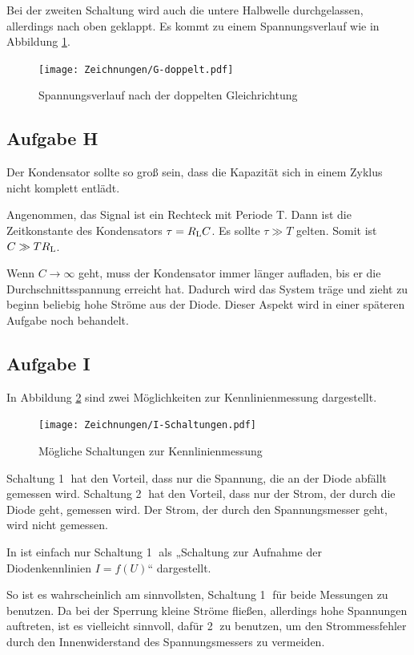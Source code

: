 Bei der zweiten Schaltung wird auch die untere Halbwelle durchgelassen,
allerdings nach oben geklappt. Es kommt zu einem Spannungsverlauf wie in
Abbildung \ref{fig:G-doppelt}.

\begin{figure}[h]
	\centering
	\caption{%
		Spannungsverlauf nach der doppelten Gleichrichtung
	}
	\label{fig:G-doppelt}
	\texttt{[image: Zeichnungen/G-doppelt.pdf]}
\end{figure}

\subsection{Aufgabe H}

Der Kondensator sollte so groß sein, dass die Kapazität sich in einem Zyklus
nicht komplett entlädt.

Angenommen, das Signal ist ein Rechteck mit Periode T. Dann ist die
Zeitkonstante des Kondensators $\tau = R_\text L C$. Es sollte $\tau \gg T$
gelten. Somit ist $C \gg T R_\text L$.

Wenn $C \to \infty$ geht, muss der Kondensator immer länger aufladen, bis er
die Durchschnittsspannung erreicht hat. Dadurch wird das System träge und zieht
zu beginn beliebig hohe Ströme aus der Diode. Dieser Aspekt wird in einer
späteren Aufgabe noch behandelt.

\subsection{Aufgabe I}

In Abbildung \ref{fig:I-Schaltungen} sind zwei Möglichkeiten zur
Kennlinienmessung dargestellt.

\begin{figure}[h]
	\centering
	\caption{%
		Mögliche Schaltungen zur Kennlinienmessung
	}
	\label{fig:I-Schaltungen}
	\texttt{[image: Zeichnungen/I-Schaltungen.pdf]}
\end{figure}

Schaltung \textcircled 1 hat den Vorteil, dass nur die Spannung, die an der
Diode abfällt gemessen wird. Schaltung \textcircled 2 hat den Vorteil, dass nur
der Strom, der durch die Diode geht, gemessen wird. Der Strom, der durch den
Spannungsmesser geht, wird nicht gemessen.

In \cite[Bild 14.2]{beuth/elementare_elektronik} ist einfach nur Schaltung
\textcircled 1 als „Schaltung zur Aufnahme der Diodenkennlinien $I = f(U)$“
dargestellt.

So ist es wahrscheinlich am sinnvollsten, Schaltung \textcircled 1 für beide
Messungen zu benutzen. Da bei der Sperrung kleine Ströme fließen, allerdings
hohe Spannungen auftreten, ist es vielleicht sinnvoll, dafür \textcircled 2 zu
benutzen, um den Strommessfehler durch den Innenwiderstand des Spannungsmessers
zu vermeiden.

